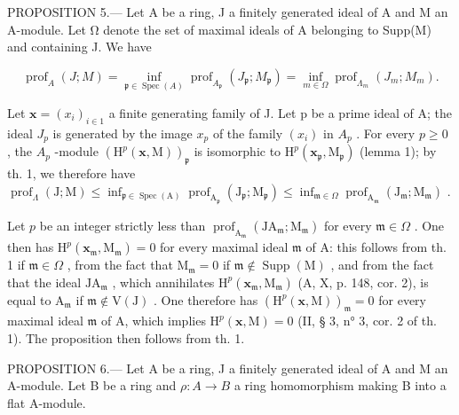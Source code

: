 PROPOSITION 5.--- Let A be a ring, J a finitely generated ideal of A and M an A-module. Let Ω denote the set of maximal ideals of A belonging to Supp(M) and containing J. We have

\[
\operatorname{prof} _ {A} (J; M) = \inf _ {\mathfrak {p} \in \operatorname{Spec} (A)} \operatorname{prof} _ {A _ {\mathfrak {p}}} \left(J _ {\mathfrak {p}}; M _ {\mathfrak {p}}\right) = \inf _ {m \in \Omega} \operatorname{prof} _ {\Lambda_ {m}} \left(J _ {m}; M _ {m}\right).
\]

Let \(\mathbf{x} = (x_{i})_{i \in 1}\) a finite generating family of J. Let p be a prime ideal of A; the ideal \(J_{p}\) is generated by the image \(x_{p}\) of the family \((x_{i})\) in \(A_{p}\) . For every \(p \geqslant 0\) , the \(A_{p}\) -module \(\left(\mathrm{H}^{p}(\mathbf{x},\mathrm{M})\right)_{\mathfrak{p}}\) is isomorphic to \(\mathrm{H}^{p}(\mathbf{x}_{\mathfrak{p}},\mathrm{M}_{\mathfrak{p}})\) (lemma 1); by th. 1, we therefore have \(\operatorname{prof}_{\Lambda}(\mathrm{J};\mathrm{M}) \leqslant \inf_{\mathfrak{p} \in \operatorname{Spec}(\mathrm{A})} \operatorname{prof}_{\mathrm{A}_{\mathfrak{p}}}(\mathrm{J}_{\mathfrak{p}}; \mathrm{M}_{\mathfrak{p}}) \leqslant \inf_{\mathfrak{m} \in \Omega} \operatorname{prof}_{\mathrm{A}_{\mathfrak{m}}}(\mathrm{J}_{\mathfrak{m}}; \mathrm{M}_{\mathfrak{m}})\) .

Let \(p\) be an integer strictly less than \(\operatorname{prof}_{\mathrm{A}_{\mathfrak{m}}}\left(\mathrm{JA}_{\mathfrak{m}};\mathrm{M}_{\mathfrak{m}}\right)\) for every \(\mathfrak{m}\in\Omega\) . One then has \(\mathrm{H}^{p}\left(\mathbf{x}_{\mathfrak{m}},\mathrm{M}_{\mathfrak{m}}\right)=0\) for every maximal ideal \(\mathfrak{m}\) of A: this follows from th. 1 if \(\mathfrak{m}\in\Omega\) , from the fact that \(\mathrm{M}_{\mathfrak{m}}=0\) if \(\mathfrak{m}\notin\operatorname{Supp}(\mathrm{M})\) , and from the fact that the ideal \(\mathrm{JA}_{\mathfrak{m}}\) , which annihilates \(\mathrm{H}^{p}\left(\mathbf{x}_{\mathfrak{m}},\mathrm{M}_{\mathfrak{m}}\right)\) (A, X, p. 148, cor. 2), is equal to \(\mathrm{A}_{\mathfrak{m}}\) if \(\mathfrak{m}\notin\mathrm{V}(\mathrm{J})\) . One therefore has \(\left(\mathrm{H}^{p}(\mathbf{x},\mathrm{M})\right)_{\mathfrak{m}}=0\) for every maximal ideal \(\mathfrak{m}\) of A, which implies \(\mathrm{H}^{p}(\mathbf{x},\mathrm{M})=0\) (II, § 3, n° 3, cor. 2 of th. 1). The proposition then follows from th. 1.

PROPOSITION 6.--- Let A be a ring, J a finitely generated ideal of A and M an A-module. Let B be a ring and \(\rho: A \to B\) a ring homomorphism making B into a flat A-module.

